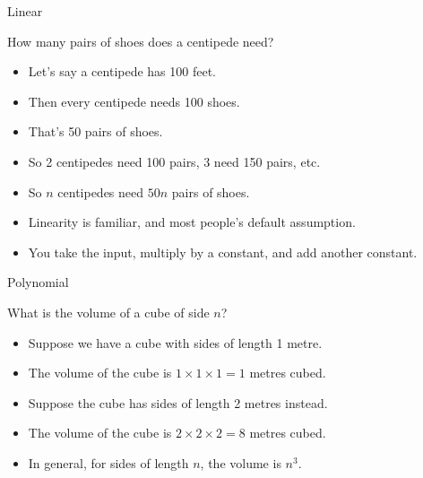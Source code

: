   
\begin{frame}{Linear}
  \begin{exampleblock}{How many pairs of shoes does a centipede need?}
    \begin{itemize}
      \item Let's say a centipede has 100 feet.
      \item Then every centipede needs 100 shoes.
      \item That's 50 pairs of shoes.
      \item So 2 centipedes need 100 pairs, 3 need 150 pairs, etc.
      \item So $n$ centipedes need $50n$ pairs of shoes.
      \item Linearity is familiar, and most people's default assumption.
      \item You take the input, multiply by a constant, and add another constant.
    \end{itemize}
  \end{exampleblock}
\end{frame}
  
  
\begin{frame}{Polynomial}
  \begin{exampleblock}{What is the volume of a cube of side $n$?}
    \begin{itemize}
      \item Suppose we have a cube with sides of length 1 metre.
      \item The volume of the cube is $1 \times 1 \times 1 = 1$ metres cubed.
      \item Suppose the cube has sides of length 2 metres instead.
      \item The volume of the cube is $2 \times 2 \times 2 = 8$ metres cubed.
      \item In general, for sides of length $n$, the volume is $n^3$.
    \end{itemize}
  \end{exampleblock}
\end{frame}
  
